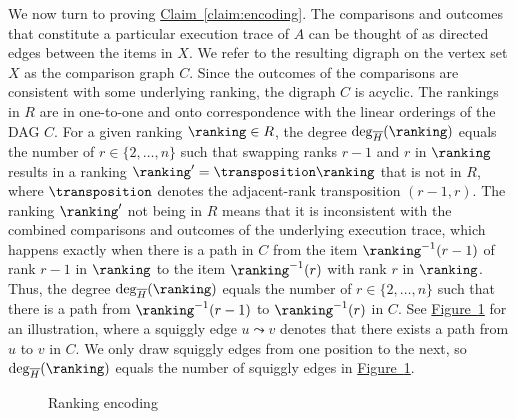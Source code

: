 \documentclass[11pt]{article}
\numberwithin{equation}{section}
\theoremstyle{definition}
\theoremstyle{plain}
\newcommand{\expref}[2]{\hyperref[#2]{#1~\ref{#2}}}
\begin{document}
We now turn to proving \expref{Claim}{claim:encoding}. The comparisons and outcomes that constitute a particular execution trace of $A$ can be thought of as directed edges between the items in $X$. We refer to the resulting digraph on the vertex set $X$ as the comparison graph $C$. Since the outcomes of the comparisons are consistent with some underlying ranking, the digraph $C$ is acyclic. The rankings in $R$ are in one-to-one and onto correspondence with the linear orderings of the DAG $C$. For a given ranking $\ranking \in R$, the degree $\deg_{\overline{H}}(\ranking)$ equals the number of $r \in \{2,\dots,n\}$ such that swapping ranks $r-1$ and $r$ in $\ranking$ results in a ranking $\ranking' = \transposition \ranking$ that is not in $R$, where $\transposition$ denotes the adjacent-rank transposition $(r-1,r)$. The ranking $\ranking'$ not being in $R$ means that it is inconsistent with the combined comparisons and outcomes of the underlying execution trace, which happens exactly when there is a path in $C$ from the item $\ranking^{-1}(r-1)$ of rank $r-1$ in $\ranking$ to the item $\ranking^{-1}(r)$ with rank $r$ in $\ranking$. Thus, the degree $\deg_{\overline{H}}(\ranking)$ equals the number of $r \in \{2,\dots,n\}$ such that there is a path from $\ranking^{-1}(r-1)$ to $\ranking^{-1}(r)$ in $C$. See \expref{Figure}{fig:encoding} for an illustration, where a squiggly edge $u \leadsto v$ denotes that there exists a path from $u$ to $v$ in $C$. We only draw squiggly edges from one position to the next, so $\deg_{\overline{H}}(\ranking)$ equals the number of squiggly edges in \expref{Figure}{fig:encoding}. 

\begin{figure}[ht]
    \centering
\caption{Ranking encoding}\label{fig:encoding}
\end{figure}
\end{document}
